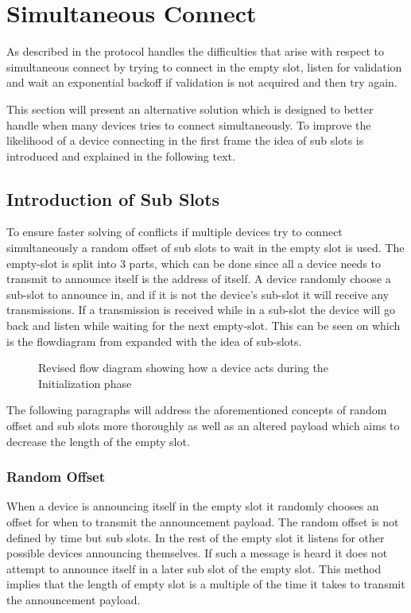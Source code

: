 \section{Simultaneous Connect}
As described in  the protocol handles the difficulties that arise with respect to simultaneous connect by trying to connect in the empty slot, listen for validation and wait an exponential backoff if validation is not acquired and then try again.

This section will present an alternative solution which is designed to better handle when many devices tries to connect simultaneously.
To improve the likelihood of a device connecting in the first frame the idea of sub slots is introduced and explained in the following text.

\subsection{Introduction of Sub Slots} %
\label{sub:introduction_of_sub_slots}
To ensure faster solving of conflicts if multiple devices try to connect simultaneously a random offset of sub slots to wait in the empty slot is used.
The empty-slot is split into 3 parts, which can be done since all a device needs to transmit to announce itself is the address of itself.
A device randomly choose a sub-slot to announce in, and if it is not the device's sub-slot it will receive any transmissions. 
If a transmission is received while in a sub-slot the device will go back and listen while waiting for the next empty-slot.
This can be seen on  which is the flowdiagram from  expanded with the idea of sub-slots.

\begin{figure}[p]
    \centering \footnotesize
    
    \caption{Revised flow diagram showing how a device acts during the Initialization phase}
    \label{fig:pseudo_flowMultiConnectimp}
\end{figure}

The following paragraphs will address the aforementioned concepts of random offset and sub slots more thoroughly as well as an altered payload which aims to decrease the length of the empty slot.

\subsubsection{Random Offset}\label{roff}
When a device is announcing itself in the empty slot it randomly chooses an offset for when to transmit the announcement payload.
The random offset is not defined by time but sub slots. 
In the rest of the empty slot it listens for other possible devices announcing themselves.
If such a message is heard it does not attempt to announce itself in a later sub slot of the empty slot.
This method implies that the length of empty slot is a multiple of the time it takes to transmit the announcement payload.

